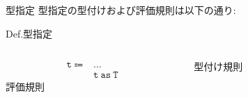 \documentclass[9pt]{beamer}
\begin{document}
\begin{frame}{型指定}
型指定の型付けおよび評価規則は以下の通り:
\begin{alertblock}{Def.型指定}
    \begin{columns}
    \begin{column}{0.30\columnwidth}
        \begin{align*}
        \mathtt{t}\Coloneq&\ldots\\
        &\mathtt{t\ as\ T}
        \end{align*}
        評価規則
        \begin{prooftree}
        \end{prooftree}
        \begin{prooftree}
        \end{prooftree}
    \end{column}
    \begin{column}{0.40\columnwidth}
        型付け規則
        \begin{prooftree}
        \end{prooftree}
    \end{column}
    \end{columns}
\end{alertblock}
\end{frame}
\end{document}

